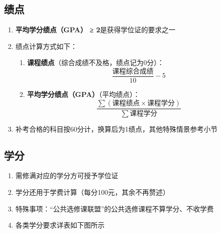 \subsection[绩点]{绩点}
\label{gpa} %
\begin{enumerate}
    \item \textbf{平均学分绩点（GPA） ≥ 2}是获得学位证的要求之一
    \item 绩点计算方式如下：
          \begin{enumerate}
              \item \textbf{课程绩点}（综合成绩不及格，绩点记为0分）：
                    \begin{equation}
                        \frac{课程综合成绩}{10} - 5
                    \end{equation}
              \item \textbf{平均学分绩点（GPA）}（平均绩点）：
                    \begin{equation}
                        \frac{\sum (课程绩点 \times 课程学分)}{\sum 课程学分}
                    \end{equation}
          \end{enumerate}\pagebreak[3]
    \item 补考合格的科目按60分计，换算后为1绩点，其他特殊情景参考小节
\end{enumerate}

\subsection[学分]{学分}
\begin{enumerate}
    \item 需修满对应的学分方可授予学位证
    \item 学分还用于学费计算（每分100元，其余不再赘述）
    \item 特殊事项：“公共选修课联盟”的公共选修课程不算学分、不收学费
    \item 各类学分要求详表\footnotemark 如下图所示
\end{enumerate}

